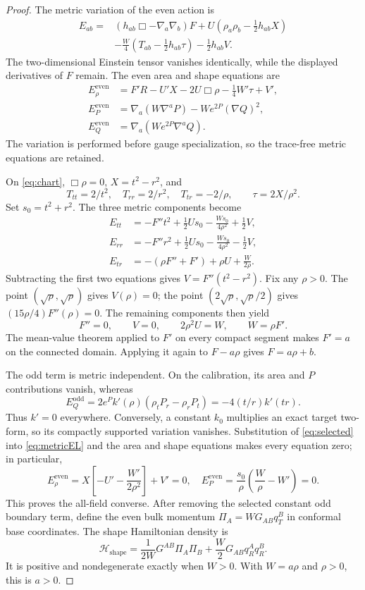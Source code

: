 \documentclass[11pt]{article}
\begin{document}
\begin{proof}
The metric variation of the even action is
\begin{equation}\label{eq:metricEL}
\begin{split}
E_{ab}={}&(h_{ab}\Box-\nabla_a\nabla_b)F
+U(\rho_a\rho_b-\tfrac12h_{ab}X)\\
&-\frac W4(T_{ab}-\tfrac12h_{ab}\tau)-\tfrac12h_{ab}V.
\end{split}
\end{equation}
The two-dimensional Einstein tensor vanishes identically, while the displayed derivatives of $F$ remain. The even area and shape equations are
\begin{align}
E_\rho^{\mathrm{even}}&=F'R-U'X-2U\Box\rho-\tfrac14W'\tau+V',\label{eq:areaEL}\\
E_P^{\mathrm{even}}&=\nabla_a(W\nabla^aP)-We^{2P}(\nabla Q)^2,\\
E_Q^{\mathrm{even}}&=\nabla_a(We^{2P}\nabla^aQ).
\end{align}
The variation is performed before gauge specialization, so the trace-free metric equations are retained.

On \eqref{eq:chart}, $\Box\rho=0$, $X=t^2-r^2$, and
\[
T_{tt}=2/t^2,\quad T_{rr}=2/r^2,\quad T_{tr}=-2/\rho,
\qquad \tau=2X/\rho^2.
\]
Set $s_0=t^2+r^2$. The three metric components become
\begin{align}
E_{tt}&=-F''t^2+\tfrac12Us_0-\frac{Ws_0}{4\rho^2}+\tfrac12V,\label{eq:tt}\\
E_{rr}&=-F''r^2+\tfrac12Us_0-\frac{Ws_0}{4\rho^2}-\tfrac12V,\label{eq:rr}\\
E_{tr}&=-(\rho F''+F')+\rho U+\frac W{2\rho}.\label{eq:tr}
\end{align}
Subtracting the first two equations gives $V=F''(t^2-r^2)$. Fix any $\rho>0$. The point $(\sqrt\rho,\sqrt\rho)$ gives $V(\rho)=0$; the point $(2\sqrt\rho,\sqrt\rho/2)$ gives $(15\rho/4)F''(\rho)=0$. The remaining components then yield
\[
F''=0,\qquad V=0,\qquad 2\rho^2U=W,\qquad W=\rho F'.
\]
The mean-value theorem applied to $F'$ on every compact segment makes $F'=a$ on the connected domain. Applying it again to $F-a\rho$ gives $F=a\rho+b$.

The odd term is metric independent. On the calibration, its area and $P$ contributions vanish, whereas
\[
E_Q^{\mathrm{odd}}=2e^Pk'(\rho)(\rho_tP_r-\rho_rP_t)
=-4(t/r)k'(tr).
\]
Thus $k'=0$ everywhere. Conversely, a constant $k_0$ multiplies an exact target two-form, so its compactly supported variation vanishes. Substitution of \eqref{eq:selected} into \eqref{eq:metricEL} and the area and shape equations makes every equation zero; in particular,
\[
E_\rho^{\mathrm{even}}=X\left[-U'-\frac{W'}{2\rho^2}\right]+V'=0,
\quad E_P^{\mathrm{even}}=\frac{s_0}{\rho}\left(\frac W\rho-W'\right)=0.
\]
This proves the all-field converse. After removing the selected constant odd boundary term, define the even bulk momentum $\Pi_A=WG_{AB}q_T^B$ in conformal base coordinates. The shape Hamiltonian density is
\[
\mathcal H_{\mathrm{shape}}=\frac1{2W}G^{AB}\Pi_A\Pi_B+
\frac W2G_{AB}q_R^Aq_R^B.
\]
It is positive and nondegenerate exactly when $W>0$. With $W=a\rho$ and $\rho>0$, this is $a>0$.
\end{proof}
\end{document}
